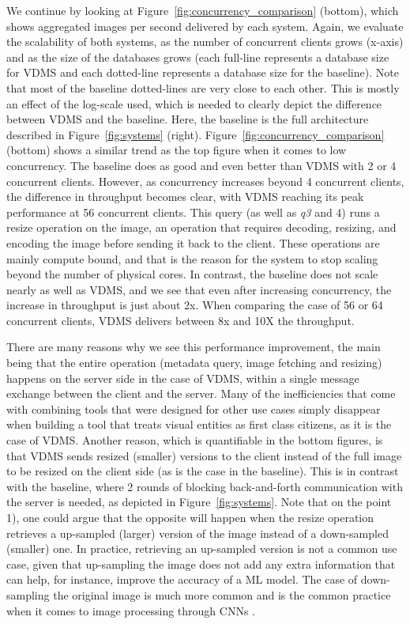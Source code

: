 We continue by looking at Figure~\ref{fig:concurrency_comparison} (bottom),
which shows aggregated images per second delivered by each system.
Again, we evaluate the scalability of both systems, as the number of
concurrent clients grows (x-axis) and as the
size of the databases grows (each full-line represents a database size
for VDMS and each dotted-line represents a database size for the baseline).
Note that most of the baseline dotted-lines are very close to each other.
This is mostly an effect of the log-scale used, which is needed to clearly
depict the difference between VDMS and the baseline.
Here, the baseline is the full architecture described in
Figure~\ref{fig:systems} (right).
Figure~\ref{fig:concurrency_comparison} (bottom) shows a similar trend as the top
figure when it comes to low concurrency. The baseline does as good and even better than VDMS with 2 or 4 concurrent clients.
However, as concurrency increases beyond 4 concurrent clients, the difference
in throughput becomes clear, with VDMS reaching its peak performance at
56 concurrent clients.
This query (as well as \textit{q3} and 4) runs a resize operation on the image,
an operation that requires decoding, resizing, and encoding the image
before sending it back to the client.
These operations are mainly compute bound, and that is the reason for
the system to stop scaling beyond the number of physical cores.
In contrast, the baseline does not scale nearly as well as VDMS,
and we see that even after increasing concurrency, the increase
in throughput is just about 2x.
When comparing the case of 56 or 64 concurrent clients,
VDMS delivers between 8x and 10X the throughput.

There are many reasons why we see this performance improvement, the main being
that the entire operation (metadata query, image fetching and resizing) happens
on the server side in the case of VDMS, within a single message
exchange between the client and the server.
Many of the inefficiencies that come with combining tools that were designed
for other use cases simply disappear when building a tool that treats
visual entities as first class citizens, as it is the case of VDMS.
Another reason, which is quantifiable in the bottom figures, is that
VDMS sends resized (smaller) versions to the client instead of the full image
to be resized on the client side (as is the case in the baseline).
This is in contrast with the baseline, where 2 rounds of blocking back-and-forth
communication with the server is needed, as depicted in Figure~\ref{fig:systems}.
Note that on the point 1), one could argue that the opposite will happen
when the resize operation retrieves a up-sampled (larger) version of the image
instead of a down-sampled (smaller) one.
In practice, retrieving an up-sampled version is not a common use case,
given that up-sampling the image does not add any extra information that can help,
for instance, improve the accuracy of a ML model.
The case of down-sampling the original image is much more common and is the common
practice when it comes to image processing through CNNs \cite{cnn,resnet}.

